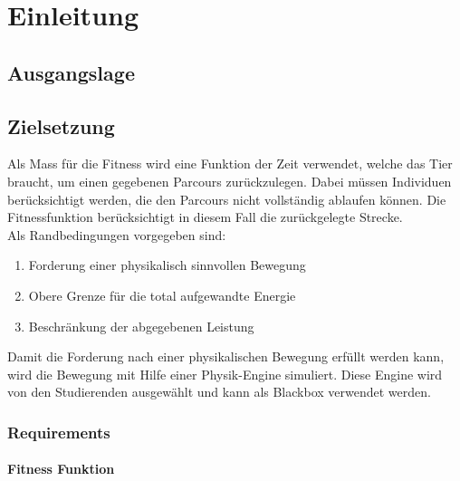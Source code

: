 %
%


\chapter{Einleitung}

  \lipsum[33-35]

\section{Ausgangslage}


\section{Zielsetzung}


  Als Mass für die Fitness wird eine Funktion der Zeit verwendet, welche das Tier braucht,
  um einen gegebenen Parcours zurückzulegen.
  Dabei müssen Individuen berücksichtigt werden, die den Parcours nicht vollständig ablaufen können.
  Die Fitnessfunktion berücksichtigt in diesem Fall die zurückgelegte Strecke.
  \\
  Als Randbedingungen vorgegeben sind:
  \begin{enumerate}
    \item Forderung einer physikalisch sinnvollen Bewegung
    \item Obere Grenze für die total aufgewandte Energie
    \item Beschränkung der abgegebenen Leistung
  \end{enumerate}
  Damit die Forderung nach einer physikalischen Bewegung erfüllt werden kann,
  wird die Bewegung mit Hilfe einer Physik-Engine simuliert.
  Diese Engine wird von den Studierenden ausgewählt und kann als Blackbox verwendet werden.

  \subsection{Requirements}

    \subsubsection{Fitness Funktion}


